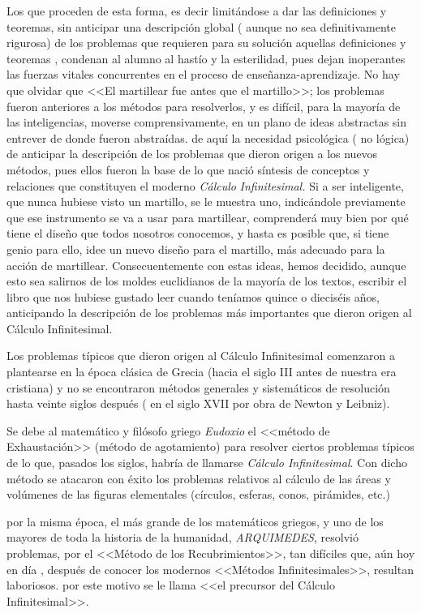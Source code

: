 Los que proceden de esta forma, es decir limitándose a dar las definiciones
y teoremas, sin anticipar una descripción global ( aunque no sea definitivamente
rigurosa) de los problemas que requieren para su solución aquellas
definiciones y teoremas , condenan al alumno al hastío y la esterilidad,
pues dejan inoperantes las fuerzas vitales concurrentes en el proceso
de enseñanza-aprendizaje. No hay que olvidar que <<El martillear
fue antes que el martillo>>; los problemas fueron anteriores a los
métodos para resolverlos, y es difícil, para la mayoría de las inteligencias,
moverse comprensivamente, en un plano de ideas abstractas sin entrever
de donde fueron abstraídas. de aquí la necesidad psicológica ( no
lógica) de anticipar la descripción de los problemas que dieron origen
a los nuevos métodos, pues ellos fueron la base de lo que nació síntesis
de conceptos y relaciones que constituyen el moderno \textsl{Cálculo}
\textsl{Infinitesimal. }Si a ser inteligente, que nunca hubiese visto
un martillo, se le muestra uno, indicándole previamente que ese instrumento
se va a usar para martillear, comprenderá muy bien por qué tiene el
diseño que todos nosotros conocemos, y hasta es posible que, si tiene
genio para ello, idee un nuevo diseño para el martillo, más adecuado
para la acción de martillear. Consecuentemente con estas ideas, hemos
decidido, aunque esto sea salirnos de los moldes euclidianos de la
mayoría de los textos, escribir el libro que nos hubiese gustado leer
cuando teníamos quince o dieciséis años, anticipando la descripción
de los problemas más importantes que dieron origen al Cálculo Infinitesimal. 

Los problemas típicos que dieron origen al Cálculo Infinitesimal comenzaron
a plantearse en la época clásica de Grecia (hacia el siglo III antes
de nuestra era cristiana) y no se encontraron métodos generales y
sistemáticos de resolución hasta veinte siglos después ( en el siglo
XVII por obra de Newton y Leibniz). 

Se debe al matemático y filósofo griego \textsl{Eudoxio} el <<método
de Exhaustación>> (método de agotamiento) para resolver ciertos problemas
típicos de lo que, pasados los siglos, habría de llamarse \textsl{Cálculo
Infinitesimal}. Con dicho método se atacaron con éxito los problemas
relativos al cálculo de las áreas y volúmenes de las figuras elementales
(círculos, esferas, conos, pirámides, etc.)

por la misma época, el más grande de los matemáticos griegos, y uno
de los mayores de toda la historia de la humanidad, \textsl{ARQUIMEDES},
resolvió problemas, por el <<Método de los Recubrimientos>>, tan
difíciles que, aún hoy en día , después de conocer los modernos <<Métodos
Infinitesimales>>, resultan laboriosos. por este motivo se le llama
<<el precursor del Cálculo Infinitesimal>>.

